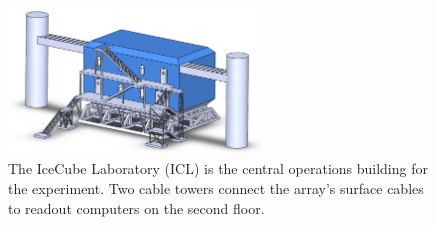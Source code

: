 \begin{figure}[!ht]
 \centering
 \includegraphics[width=0.6\textwidth]{graphics/intro/icl.png}
 \caption{The IceCube Laboratory (ICL) is the central operations building
   for the experiment.  Two cable towers connect the array's surface cables
   to readout computers on the second floor.}
 \label{fig:icl}
\end{figure}
